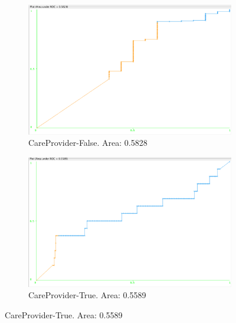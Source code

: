 \documentclass[11pt, notitlepage,abstracton,oneside]{article}   	%
\begin{document}
\begin{figure}[H]
    \centering
    \begin{subfigure}[b]{0.45\textwidth}
        \centering
        \includegraphics[width=\textwidth]{figures/approach2/CareProvider-False(0)}
        \caption{CareProvider-False. Area: 0.5828}
        \label{fig:CareProvider-False(0)}
    \end{subfigure}
    \hfill
    \begin{subfigure}[b]{0.45\textwidth}
        \centering
        \includegraphics[width=\textwidth]{figures/approach2/CareProvider-True(1)}
        \caption{CareProvider-True. Area: 0.5589}
        \label{fig:CareProvider-True(1)}
    \end{subfigure}
    \hfill


\end{figure}
\end{document}
